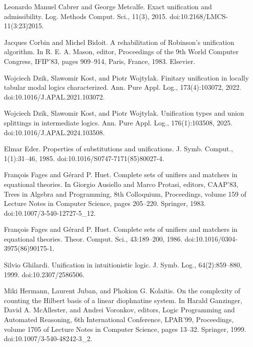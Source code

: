 \par\noindent  [24]  Leonardo Manuel Cabrer and George Metcalfe.  Exact unification and admissibility.  Log. Methods Comput. Sci., 11(3), 2015.  doi:10.2168/LMCS-11(3:23)2015.  
 
\par\noindent  [25]  Jacques Corbin and Michel Bidoit.  A rehabilitation of Robinson’s unification algorithm.  In R. E. A. Mason, editor, Proceedings of the 9th World Computer Congress, IFIP’83, pages 909–914, Paris, France, 1983. Elsevier.  
 
\par\noindent  [26]  Wojciech Dzik, Slawomir Kost, and Piotr Wojtylak.  Finitary unification in locally tabular modal logics characterized.  Ann. Pure Appl. Log., 173(4):103072, 2022.  doi:10.1016/J.APAL.2021.103072.  
 
\par\noindent  [27]  Wojciech Dzik, Slawomir Kost, and Piotr Wojtylak.  Unification types and union splittings in intermediate logics.  Ann. Pure Appl. Log., 176(1):103508, 2025.  doi:10.1016/J.APAL.2024.103508.  
 
\par\noindent  [28]  Elmar Eder.  Properties of substitutions and unifications.  J. Symb. Comput., 1(1):31–46, 1985.  doi:10.1016/S0747-7171(85)80027-4.  
 
\par\noindent  [29]  François Fages and Gérard P. Huet.  Complete sets of unifiers and matchers in equational theories.  In Giorgio Ausiello and Marco Protasi, editors, CAAP’83, Trees in Algebra and Programming, 8th Colloquium, Proceedings, volume 159 of Lecture Notes in Computer Science, pages 205–220. Springer, 1983.  doi:10.1007/3-540-12727-5\_12.  
 
\par\noindent  [30]  François Fages and Gérard P. Huet.  Complete sets of unifiers and matchers in equational theories.  Theor. Comput. Sci., 43:189–200, 1986.  doi:10.1016/0304-3975(86)90175-1.  
 
\par\noindent  [31]  Silvio Ghilardi.  Unification in intuitionistic logic.  J. Symb. Log., 64(2):859–880, 1999.  doi:10.2307/2586506.  
 
\par\noindent  [32]  Miki Hermann, Laurent Juban, and Phokion G. Kolaitis.  On the complexity of counting the Hilbert basis of a linear diophnatine system.  In Harald Ganzinger, David A. McAllester, and Andrei Voronkov, editors, Logic Programming and Automated Reasoning, 6th International Conference, LPAR’99, Proceedings, volume 1705 of Lecture Notes in Computer Science, pages 13–32. Springer, 1999.  doi:10.1007/3-540-48242-3\_2.  
 
